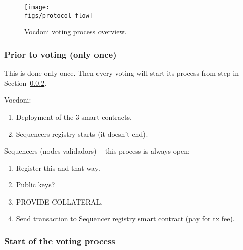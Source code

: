 \begin{figure}[H]
	\centerline{\texttt{[image: \\figs/protocol-flow]}}
	\caption{Vocdoni voting process overview.}
	\label{fig:protocol-flow}
\end{figure}

\subsubsection{Prior to voting (only once)}
\label{sec:vocdoni-protocol:prior-steps}


This is done only once. Then every voting will start its process from step in Section~\ref{sec:vocdoni-protocol:start}.

Vocdoni:
\begin{enumerate}
	\item Deployment of the 3 smart contracts.
	\item Sequencers registry starts (it doesn't end).
\end{enumerate}

Sequencers (nodes validadors) -- this process is always open:
\begin{enumerate}
	\item Register this and that way.
	\item Public keys?
	\item PROVIDE COLLATERAL.
	\item Send transaction to Sequencer registry smart contract (pay for tx fee).
\end{enumerate}

\subsubsection{Start of the voting process}
\label{sec:vocdoni-protocol:start}

